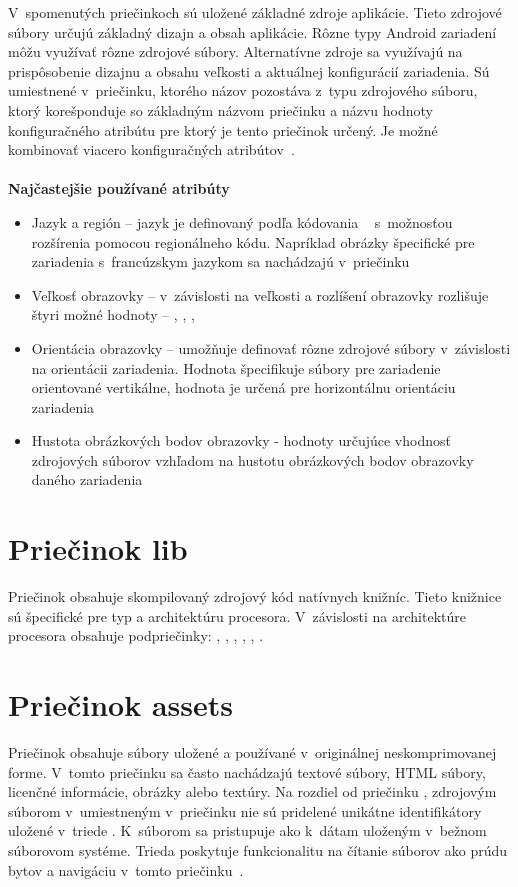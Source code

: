 \noindent V~spomenutých priečinkoch sú uložené základné zdroje aplikácie. Tieto zdrojové súbory určujú základný dizajn a obsah aplikácie. Rôzne typy Android zariadení môžu využívať rôzne zdrojové súbory. Alternatívne zdroje sa využívajú na prispôsobenie dizajnu a obsahu veľkosti a aktuálnej konfigurácií zariadenia. Sú umiestnené v~priečinku, ktorého názov pozostáva z~typu zdrojového súboru, ktorý korešponduje so základným názvom priečinku a názvu hodnoty konfiguračného atribútu pre ktorý je tento priečinok určený. Je možné kombinovať viacero konfiguračných atribútov~\cite{providingAltRes}.\\\\
\textbf{Najčastejšie používané atribúty}
\begin{itemize}
\item Jazyk a región – jazyk je definovaný podľa kódovania ~\cite{isoCodes} s~možnosťou rozšírenia pomocou  regionálneho kódu. Napríklad obrázky špecifické pre zariadenia s~francúzskym jazykom sa nachádzajú v~priečinku 
\item Veľkosť obrazovky –  v~závislosti na veľkosti a rozlíšení obrazovky rozlišuje štyri možné hodnoty -- , , , 
\item Orientácia obrazovky – umožňuje definovať rôzne zdrojové súbory v~závislosti na orientácii zariadenia. Hodnota  špecifikuje súbory pre zariadenie orientované vertikálne, hodnota  je určená pre horizontálnu orientáciu zariadenia	
\item Hustota obrázkových bodov obrazovky -  hodnoty určujúce vhodnosť zdrojových súborov vzhľadom na hustotu obrázkových bodov obrazovky daného zariadenia
\end{itemize}


\section{Priečinok lib}
\label{lib}
Priečinok  obsahuje skompilovaný zdrojový kód natívnych knižníc. Tieto knižnice sú špecifické pre typ a architektúru procesora. V~závislosti na architektúre procesora obsahuje podpriečinky: , , , , , .

\section{Priečinok assets}
\label{assets}
Priečinok  obsahuje súbory uložené a používané v~originálnej neskomprimovanej forme. V~tomto priečinku sa často nachádzajú textové súbory, HTML súbory, licenčné informácie, obrázky alebo textúry. Na rozdiel od priečinku , zdrojovým súborom v~umiestneným v~priečinku  nie sú pridelené unikátne identifikátory uložené v~triede . K~súborom sa pristupuje ako k~dátam uloženým v~bežnom súborovom systéme. Trieda  poskytuje funkcionalitu na čítanie súborov ako prúdu bytov a navigáciu v~tomto priečinku~\cite{AssetManager}.

